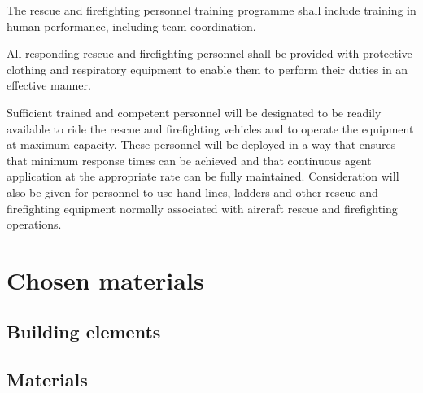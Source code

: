 	The rescue and firefighting personnel training programme shall include training in human performance, including team coordination.
	
	All responding rescue and firefighting personnel shall be provided with protective clothing and respiratory equipment to enable them to perform their duties in an effective manner.
	
	Sufficient trained and competent personnel will be designated to be readily available to ride the rescue and firefighting vehicles and to operate the equipment at maximum capacity. These personnel will be deployed in a way that ensures that minimum response times can be achieved and that continuous agent application at the appropriate rate can be fully maintained. Consideration will also be given for personnel to use hand lines, ladders and other rescue and firefighting equipment normally associated with aircraft rescue and firefighting operations.
\section{Chosen materials}
		\subsection{Building elements}
		\subsection{Materials}